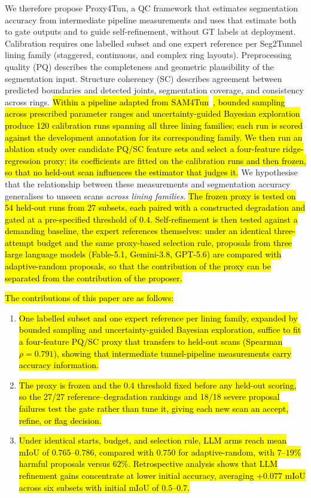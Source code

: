 \documentclass[a4paper,fleqn]{cas-dc}
\begin{document}
{We therefore propose Proxy4Tun, a QC framework that estimates segmentation accuracy from intermediate pipeline measurements and uses that estimate both to gate outputs and to guide self-refinement, without GT labels at deployment. Calibration requires one labelled subset and one expert reference per Seg2Tunnel lining family (staggered, continuous, and complex ring layouts). Preprocessing quality (PQ) describes the completeness and geometric plausibility of the segmentation input. Structure coherency (SC) describes agreement between predicted boundaries and detected joints, segmentation coverage, and consistency across rings. \hl{Within a pipeline adapted from SAM4Tun}~\cite{ye2025sam4tun}\hl{, bounded sampling across prescribed parameter ranges and uncertainty-guided Bayesian exploration produce 120 calibration runs spanning all three lining families; each run is scored against the development annotation for its corresponding family. We then run an ablation study over candidate PQ/SC feature sets and select a four-feature ridge-regression proxy; its coefficients are fitted on the calibration runs and then frozen, so that no held-out scan influences the estimator that judges it.} We hypothesise that the relationship between these measurements and segmentation accuracy generalises to unseen scans \textit{across lining families}. \hl{The frozen proxy is tested on 54 held-out runs from 27 subsets, each paired with a constructed degradation and gated at a pre-specified threshold of $0.4$. Self-refinement is then tested against a demanding baseline, the expert references themselves: under an identical three-attempt budget and the same proxy-based selection rule, proposals from three large language models (Fable-5.1, Gemini-3.8, GPT-5.6) are compared with adaptive-random proposals, so that the contribution of the proxy can be separated from the contribution of the proposer.}

\hl{The contributions of this paper are as follows:}
\begin{enumerate}
\item \hl{One labelled subset and one expert reference per lining family, expanded by bounded sampling and uncertainty-guided Bayesian exploration, suffice to fit a four-feature PQ/SC proxy that transfers to held-out scans (Spearman $\rho=0.791$), showing that intermediate tunnel-pipeline measurements carry accuracy information.}
\item \hl{The proxy is frozen and the $0.4$ threshold fixed before any held-out scoring, so the 27/27 reference--degradation rankings and 18/18 severe proposal failures test the gate rather than tune it, giving each new scan an accept, refine, or flag decision.}
\item \hl{Under identical starts, budget, and selection rule, LLM arms reach mean mIoU of $0.765$--$0.786$, compared with $0.750$ for adaptive-random, with $7$--$19\%$ harmful proposals versus $62\%$. Retrospective analysis shows that LLM refinement gains concentrate at lower initial accuracy, averaging $+0.077$ mIoU across six subsets with initial mIoU of $0.5$--$0.7$.}
\end{enumerate}

}
\end{document}
